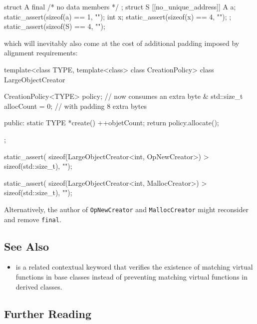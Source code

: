 {{{\begin{emcppslisting}[style=footcode]
struct A final { /* no data members */ };
struct S {
    [[no_unique_address]] A a;  static_assert(sizeof(a) == 1, "");
    int x;                      static_assert(sizeof(x) == 4, "");
};                              static_assert(sizeof(S) == 4, "");
\end{emcppslisting}
      }} which will inevitably also come at the cost of additional
padding imposed by alignment requirements:

\begin{emcppslisting}
template<class TYPE, template<class> class CreationPolicy>
class LargeObjectCreator
{
    CreationPolicy<TYPE> policy;  // now consumes an extra byte &
    std::size_t allocCount = 0;   // with padding 8 extra bytes

public:
    static TYPE *create()
    {
        ++objetCount;
        return policy.allocate();
    }
};

static_assert(
    sizeof(LargeObjectCreator<int, OpNewCreator>) > sizeof(std::size_t), "");

static_assert(
    sizeof(LargeObjectCreator<int, MallocCreator>) > sizeof(std::size_t), "");
\end{emcppslisting}
    

\noindent Alternatively, the author of \lstinline!OpNewCreator! and
\lstinline!MallocCreator! might reconsider and remove \lstinline!final!.

\subsection[See Also]{See Also}\label{see-also}

\begin{itemize}
\item{ is a related contextual
keyword that verifies the existence of matching virtual functions in
base classes instead of preventing matching virtual functions in derived
classes.}
\end{itemize}

\subsection[Further Reading]{Further Reading}\label{further-reading}

}
